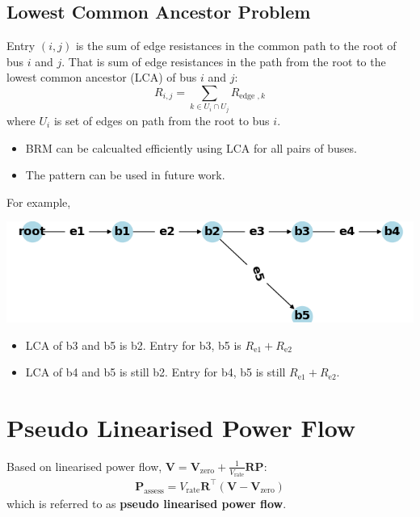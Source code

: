 \documentclass[
]{book}
\providecommand{\tightlist}{%
  \setlength{\itemsep}{0pt}\setlength{\parskip}{0pt}}
\begin{document}
\hypertarget{LCA}{%
\subsection*{Lowest Common Ancestor Problem}\label{LCA}}

Entry \((i, j)\) is the sum of edge resistances in the common path to the root of
bus \(i\) and \(j\). That is sum of edge resistances in the path from the root to
the lowest common ancestor (LCA) of bus \(i\) and \(j\):
\[
R_{i, j}=\sum_{k \in U_{i} \cap U_{j}} R_{\text {edge }, k}
\]
where \(U_{i}\) is set of edges on path from the root to bus \(i\).

\begin{itemize}
\tightlist
\item
  BRM can be calcualted efficiently using LCA for all pairs of buses.
\item
  The pattern can be used in future work.
\end{itemize}

For example,

\begin{center}\includegraphics[width=0.7\linewidth]{Pictures/figCaseSix} \end{center}

\begin{itemize}
\tightlist
\item
  LCA of b3 and b5 is b2. Entry for b3, b5 is \(R_\text{e1} + R_\text{e2}\)
\item
  LCA of b4 and b5 is still b2. Entry for b4, b5 is still \(R_\text{e1} + R_\text{e2}\).
\end{itemize}

\hypertarget{pseudo-linearised-power-flow}{%
\section{Pseudo Linearised Power Flow}\label{pseudo-linearised-power-flow}}

Based on linearised power flow, \(\boldsymbol{V} = \boldsymbol{V}_\text{zero} + \frac{1}{V_\text{rate}} \boldsymbol{R} \boldsymbol{P}\):
\[ \begin{aligned}
    \boldsymbol{P}_\text{assess} =
    V_\text{rate} \boldsymbol{R}^{\top}
    \left( \boldsymbol{V} - \boldsymbol{V}_\text{zero} \right)
\end{aligned} \]
which is referred to as \textbf{pseudo linearised power flow}.
\end{document}
